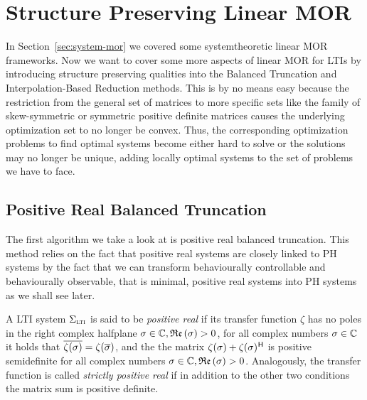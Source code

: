\section{Structure Preserving Linear MOR}\label{sec:structure-preserving-mor}

In Section~\ref{sec:system-mor} we covered some systemtheoretic linear MOR frameworks.
Now we want to cover some more aspects of linear MOR for \acp{LTI} by introducing structure preserving qualities into the Balanced Truncation and Interpolation-Based Reduction methods.
This is by no means easy because the restriction from the general set of matrices to more specific sets like the family of skew-symmetric or symmetric positive definite matrices causes the underlying optimization set to no longer be convex.
Thus, the corresponding optimization problems to find optimal systems become either hard to solve or the solutions may no longer be unique, adding locally optimal systems to the set of problems we have to face.

\subsection{Positive Real Balanced Truncation}\label{subsec:prbt}

The first algorithm we take a look at is positive real balanced truncation.
This method relies on the fact that positive real systems are closely linked to \ac{PH} systems by the fact that we can transform behaviourally controllable and behaviourally observable, that is minimal, positive real systems into \ac{PH} systems as we shall see later.

\begin{definition}\label{def:positive-real}
    A \ac{LTI} system $\Sigma_{\textnormal{\scshape lti}}$ is said to be \emph{positive real} if its transfer function $\zeta$ has no poles in the right complex halfplane $\sigma \in \mathbb{C}, \mathop{}\!\mathfrak{Re}\left(\sigma\right) > 0$, for all complex numbers $\sigma \in \mathbb{C}$ it holds that $\overline{\zeta(\sigma)} = \zeta(\overline{\sigma})$, and the the matrix $\zeta(\sigma) + \zeta(\sigma)^{\mkern1mu \mathsf{H}}$ is positive semidefinite for all complex numbers $\sigma \in \mathbb{C}, \mathop{}\!\mathfrak{Re}\left(\sigma\right) > 0$.
    Analogously, the transfer function is called \emph{strictly positive real} if in addition to the other two conditions the matrix sum is positive definite.
\end{definition}

